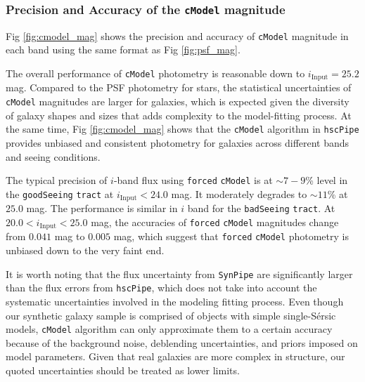 \documentclass[useamsfonts]{pasj01}
\def\ser{{S\'{e}rsic\ }}
\def\hscpipe{\texttt{hscPipe}}
\def\synpipe{\texttt{SynPipe}}
\def\cmodel{\texttt{cModel}}
\def\forced{\texttt{forced}}
\def\tract{\texttt{tract}}
\newcommand{\plus}{\raisebox{.4\height}{\scalebox{.6}{+}}}
\newcommand{\minus}{\raisebox{.4\height}{\scalebox{.8}{-}}}
\begin{document}
\subsubsection{Precision and Accuracy of the \cmodel{} magnitude}

    Fig \ref{fig:cmodel_mag} shows the precision and accuracy of \cmodel{} magnitude 
    in each band using the same format as Fig \ref{fig:psf_mag}.

    The overall performance of \cmodel{} photometry is reasonable down to 
    $i_{\mathrm{Input}}=25.2$ mag.
    Compared to the PSF photometry for stars, the statistical uncertainties of \cmodel{} 
    magnitudes are larger for galaxies, which is expected given the diversity of galaxy 
    shapes and sizes that adds complexity to the model-fitting process.
    At the same time, Fig \ref{fig:cmodel_mag} shows that the \cmodel{} algorithm in
    \hscpipe{} provides unbiased and consistent photometry for galaxies across 
    different bands and seeing conditions.

    The typical precision of $i$-band flux using \forced{} \cmodel{} is at 
    ${\sim}7-9$\% level in the \texttt{goodSeeing} \tract{} at 
    $i_{\mathrm{Input}}<24.0$ mag. 
    It moderately degrades to ${\sim}11$\% at $25.0$ mag. 
    The performance is similar in $i$ band for the \texttt{badSeeing} \tract{}. 
    At $20.0 < i_{\mathrm{Input}} < 25.0$ mag, the accuracies of \forced{} \cmodel{}
    magnitudes change from \plus{}$0.041$ mag to \minus{}$0.005$ mag, which suggest
    that \forced{} \cmodel{} photometry is unbiased down to the very faint end.
    
    It is worth noting that the flux uncertainty from \synpipe{} are significantly 
    larger than the flux errors from \hscpipe{}, which does not take into account the 
    systematic uncertainties involved in the modeling fitting process. 
    Even though our synthetic galaxy sample is comprised of objects with simple 
    single-\ser{} models, \cmodel{} algorithm can only approximate them to a certain 
    accuracy because of the background noise, deblending uncertainties, and priors 
    imposed on model parameters. 
    Given that real galaxies are more complex in structure, our quoted uncertainties 
    should be treated as lower limits.

\end{document}
